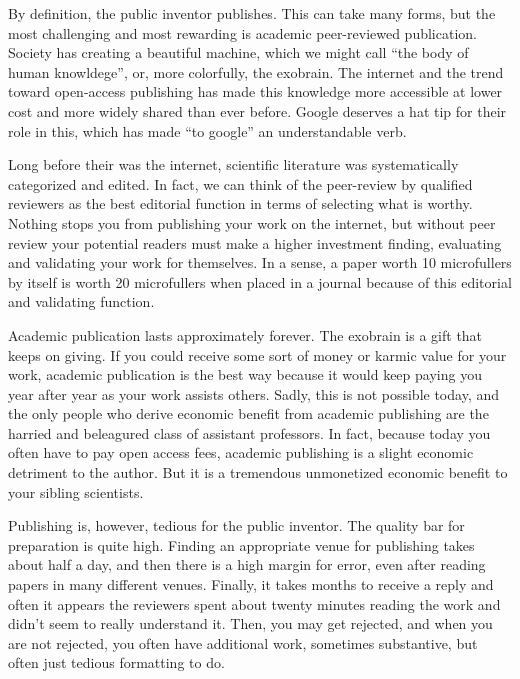 \documentclass[
	fontsize=10pt, %
	twoside=false, %
	secnumdepth=1, %
]{kaobook}
\begin{document}
By definition, the public inventor publishes.
This can take many forms, but the most challenging and most rewarding
is academic peer-reviewed publication.
Society has creating a beautiful machine, which we might
call ``the body of human knowldege'', or, more colorfully, the exobrain.
The internet and the trend toward open-access publishing has made this
knowledge more accessible at lower cost and more widely shared
than ever before.
Google deserves a hat tip for their role in this, which has made
``to google'' an understandable verb.

Long before their was the internet, scientific literature was systematically categorized
and edited. In fact, we can think of the peer-review by qualified
reviewers as the best editorial function in terms of selecting what
is worthy.
Nothing stops you from publishing your work on the internet, but
without peer review your potential readers must make a higher investment
finding, evaluating and validating your work for themselves.
In a sense, a paper worth 10 microfullers by itself is worth
20 microfullers when placed in a journal because of this
editorial and validating function.

Academic publication lasts approximately forever.
The exobrain is a gift that keeps on giving.
If you could receive some sort of money or karmic value
for your work, academic publication is the best way
because it would keep paying you year after year as
your work assists others. Sadly, this is not possible
today, and the only people who derive economic benefit
from academic publishing are the harried and beleagured class of assistant professors.
In fact, because today you often have to pay open access fees, academic
publishing is a slight economic detriment to the author.
But it is a tremendous unmonetized economic benefit to your
sibling scientists.

Publishing is, however, tedious for the public inventor.
The quality bar for preparation is quite high.
Finding an appropriate venue for publishing takes about half a day, and
then there is a high margin for error, even after reading papers in many
different venues.
Finally, it takes months to receive a reply and often it appears
the reviewers spent about twenty minutes reading the work and didn't seem
to really understand it.
Then, you may get rejected, and when you are not rejected, you often
have additional work, sometimes substantive, but often just tedious formatting to do.
\end{document}

